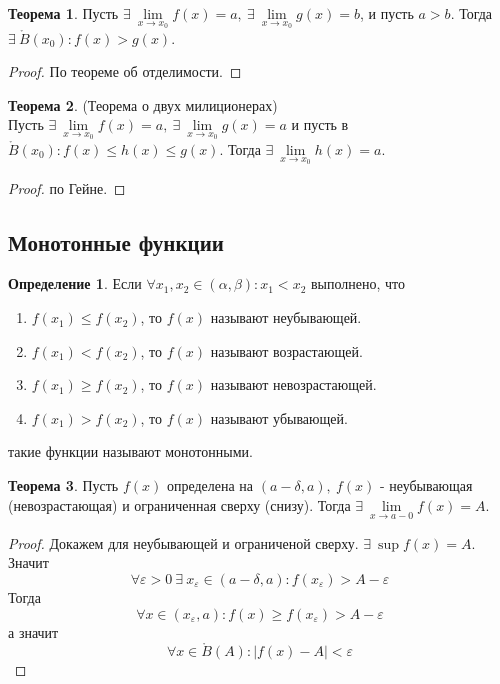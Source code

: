 \documentclass[a4paper, 12pt]{article}
\newcommand{\Bo}{\mathring{B}}
\renewcommand{\epsilon}{\varepsilon}
\theoremstyle{definition}
\newtheorem*{definition}{Определение}
\newtheorem*{theorem}{Теорема}
\begin{document}
        \begin{theorem}
            Пусть $\exists\ \lim\limits_{x\to x_0}f(x)=a,\ \exists\ \lim\limits_{x\to x_0}g(x)=b$, и пусть $a>b$. Тогда $\exists\ \Bo(x_0): f(x)>g(x)$.
        \end{theorem}
        \begin{proof}
            По теореме об отделимости.
        \end{proof} 
        \begin{theorem}(Теорема о двух милиционерах)\\
            Пусть $\exists\ \lim\limits_{x\to x_0}f(x)=a,\ \exists\ \lim\limits_{x\to x_0}g(x)=a$ и пусть в $\Bo(x_0): f(x)\leq h(x)\leq g(x)$. Тогда $\exists\ \lim\limits_{x\to x_0}h(x)=a$.
        \end{theorem} 
        \begin{proof}
            по Гейне.
        \end{proof} 
    \subsection{Монотонные функции}
        \begin{definition}
            Если $\forall x_1, x_2\in (\alpha, \beta): x_1<x_2$ выполнено, что
            \begin{enumerate}
                \item $f(x_1)\leq f(x_2)$, то $f(x)$ называют неубывающей.
                \item $f(x_1)< f(x_2)$, то $f(x)$ называют возрастающей.
                \item $f(x_1)\geq f(x_2)$, то $f(x)$ называют невозрастающей.
                \item $f(x_1)> f(x_2)$, то $f(x)$ называют убывающей.
            \end{enumerate}
            такие функции называют монотонными.
        \end{definition} 
        \begin{theorem}
            Пусть $f(x)$ определена на $(a-\delta, a),\ f(x)$ - неубывающая (невозрастающая) и ограниченная сверху (снизу). Тогда $\exists\ \lim\limits_{x\to a-0}f(x)=A$.
        \end{theorem} 
        \begin{proof}
            Докажем для неубывающей и ограниченой сверху. $\exists\ \sup{f(x)}=A$. Значит
            \[\forall \epsilon>0\ \exists\ x_{\epsilon}\in (a-\delta, a): f(x_{\epsilon})>A-\epsilon\] 
            Тогда 
            \[\forall x\in (x_{\epsilon},a): f(x)\geq f(x_{\epsilon})>A-\epsilon\] 
            а значит
            \[\forall x\in \Bo(A): |f(x)-A|<\epsilon\]
        \end{proof}
\end{document}
